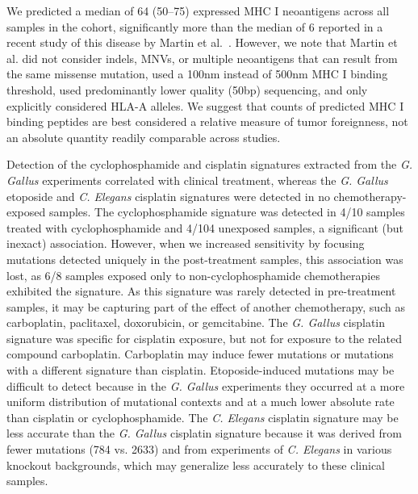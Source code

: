 We predicted a median of 64 (50--75) expressed MHC I neoantigens across all samples in the cohort, significantly more than the median of 6 reported in a recent study of this disease by Martin et al.~\cite{Martin_2016}. However, we note that Martin et al. did not consider indels, MNVs, or multiple neoantigens that can result from the same missense mutation, used a 100nm instead of 500nm MHC I binding threshold, used predominantly lower quality (50bp) sequencing, and only explicitly considered HLA-A alleles. We suggest that counts of predicted MHC I binding peptides are best considered a relative measure of tumor foreignness, not an absolute quantity readily comparable across studies.

Detection of the cyclophosphamide and cisplatin signatures extracted from the \textit{G. Gallus} experiments correlated with clinical treatment, whereas the \textit{G. Gallus} etoposide and \textit{C. Elegans} cisplatin signatures were detected in no chemotherapy-exposed samples. The cyclophosphamide signature was detected in 4/10 samples treated with cyclophosphamide and 4/104 unexposed samples, a significant (but inexact) association. However, when we increased sensitivity by focusing mutations detected uniquely in the post-treatment samples, this association was lost, as 6/8 samples exposed only to non-cyclophosphamide chemotherapies exhibited the signature. As this signature was rarely detected in pre-treatment samples, it may be capturing part of the effect of another chemotherapy, such as carboplatin, paclitaxel, doxorubicin, or gemcitabine. The \textit{G. Gallus} cisplatin signature was specific for cisplatin exposure, but not for exposure to the related compound carboplatin. Carboplatin may induce fewer mutations or mutations with a different signature than cisplatin. Etoposide-induced mutations may be difficult to detect because in the \textit{G. Gallus} experiments they occurred at a more uniform distribution of mutational contexts and at a much lower absolute rate than cisplatin or cyclophosphamide. The \textit{C. Elegans} cisplatin signature may be less accurate than the \textit{G. Gallus} cisplatin signature because it was derived from fewer mutations (784 vs. 2633) and from experiments of \textit{C. Elegans} in various knockout backgrounds, which may generalize less accurately to these clinical samples.



